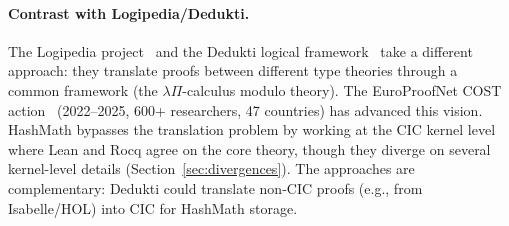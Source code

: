 \documentclass[11pt]{article}
\theoremstyle{definition}
\theoremstyle{plain}
\theoremstyle{remark}
\begin{document}
\paragraph{Contrast with Logipedia/Dedukti.}
The Logipedia project~\cite{logipedia} and the Dedukti logical framework~\cite{dedukti}
take a different approach: they translate proofs between different type theories through a common
framework (the $\lambda\Pi$-calculus modulo theory).
The EuroProofNet COST action~\cite{europroofnet} (2022--2025, 600+ researchers, 47 countries)
has advanced this vision.
HashMath bypasses the translation problem by working at the CIC kernel level where Lean and
Rocq agree on the core theory, though they diverge on several kernel-level details
(Section~\ref{sec:divergences}).
The approaches are complementary: Dedukti could translate non-CIC proofs (e.g., from
Isabelle/HOL) into CIC for HashMath storage.
\end{document}
